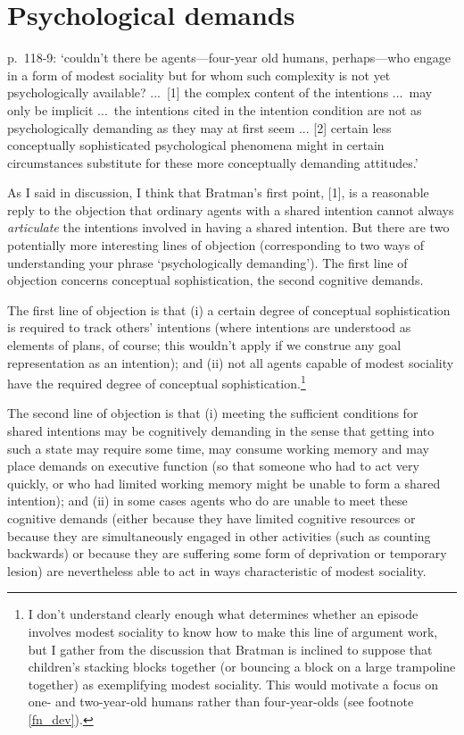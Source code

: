 \documentclass[12pt,letterpaper]{extarticle}
\begin{document}
\section{Psychological demands}
p.\ 118-9: `couldn't there be agents---four-year old humans, perhaps---who engage in a form of modest sociality but for
whom such complexity is not yet psychologically available? 
...\
[1] the complex content of the intentions ...\ may only be implicit ...\  the intentions cited in the intention condition are not as psychologically demanding as they may at first seem 
...
[2] certain less conceptually sophisticated psychological phenomena might in certain circumstances substitute for these more conceptually demanding attitudes.' 

As I said in discussion, I think that Bratman's first point, [1], is a reasonable reply to the objection that ordinary agents with a shared intention cannot always \emph{articulate} the intentions involved in having a shared intention.  
But there are two potentially more interesting lines of objection (corresponding to two ways of understanding your phrase `psychologically demanding').
The first line of objection concerns conceptual sophistication, the second cognitive demands.

The first line of objection is that (i) a certain degree of conceptual sophistication is required to track others' intentions (where intentions are understood as elements of plans, of course; this wouldn't apply if we construe any goal representation as an intention); and (ii) not all agents capable of modest sociality have the required degree of conceptual sophistication.\footnote{
I don't understand clearly enough what determines whether an episode involves modest sociality
to know how to make this line of argument work, 
but I gather from the discussion that Bratman is inclined to suppose that children's stacking blocks together (or bouncing a block on a large trampoline together) as exemplifying modest sociality.
This would motivate a focus on one- and two-year-old humans rather than four-year-olds (see footnote \vref{fn_dev}).
}

The second line of objection is that (i) meeting the sufficient conditions for shared intentions may be cognitively demanding in the sense that  getting into such a state may require some time, may consume working memory and may place demands on executive function (so that someone who had to act very quickly, or who had limited working memory might be unable to form a shared intention); and (ii) in some cases agents who do are unable to meet these cognitive demands (either because they have limited cognitive resources or because they are simultaneously engaged in other activities (such as counting backwards) or because they are suffering some form of deprivation or temporary lesion) are nevertheless able to act in ways characteristic of modest sociality.
\end{document}
